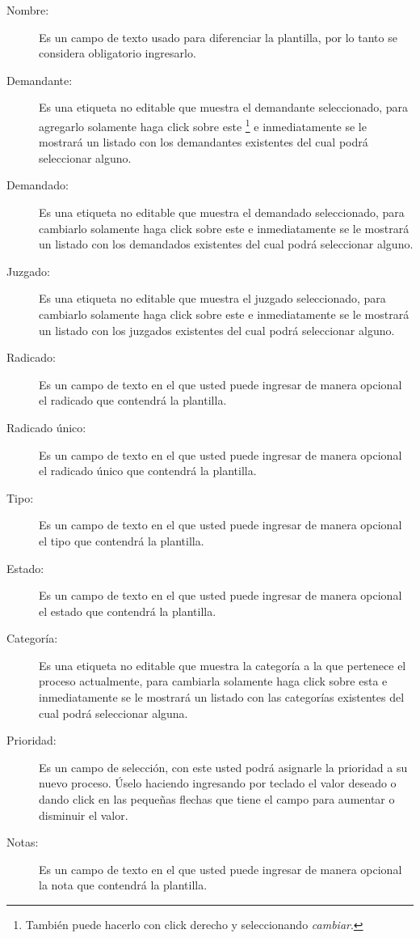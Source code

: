 \begin{description}
\item[Nombre:]Es un campo de texto usado para diferenciar la plantilla, por lo
tanto se considera obligatorio ingresarlo.
\item[Demandante:]Es una etiqueta no editable que muestra el demandante
seleccionado, para agregarlo solamente haga click sobre este
\footnote{Tambi\'en puede hacerlo con click derecho y seleccionando \emph{cambiar}.}
e inmediatamente se
le mostrar\'a un listado con los demandantes existentes del cual podr\'a
seleccionar alguno.
\item[Demandado:]Es una etiqueta no editable que muestra el demandado
seleccionado, para cambiarlo solamente haga click sobre este
\footnotemark[\value{footnote}]
e inmediatamente
se le mostrar\'a un listado con los demandados existentes del cual podr\'a
seleccionar alguno.
\item[Juzgado:]Es una etiqueta no editable que muestra el juzgado
seleccionado, para cambiarlo solamente haga click sobre este
\footnotemark[\value{footnote}]
e inmediatamente
se le mostrar\'a un listado con los juzgados existentes del cual podr\'a
seleccionar alguno.
\item[Radicado:]Es un campo de texto en el que usted puede ingresar de manera
opcional el radicado que contendr\'a la plantilla.
\item[Radicado \'unico:]Es un campo de texto en el que usted puede ingresar de
manera opcional el radicado \'unico que contendr\'a la plantilla.
\item[Tipo:]Es un campo de texto en el que usted puede ingresar de manera
opcional el tipo que contendr\'a la plantilla.
\item[Estado:]Es un campo de texto en el que usted puede ingresar de manera
opcional el estado que contendr\'a la plantilla.
\item[Categor\'ia:]Es una etiqueta no editable que muestra la categor\'ia
a la que pertenece el proceso actualmente, para cambiarla solamente haga click
sobre esta
\footnotemark[\value{footnote}]
e inmediatamente
se le mostrar\'a un listado con las categor\'ias existentes del cual podr\'a
seleccionar alguna.
\item[Prioridad:]Es un campo de selecci\'on, con este usted podr\'a asignarle
la prioridad a su nuevo proceso. \'Uselo haciendo ingresando por teclado el valor deseado o dando click en las peque\~nas flechas que tiene el campo para aumentar o disminuir el valor.
\item[Notas:]Es un campo de texto en el que usted puede ingresar de manera
opcional la nota que contendr\'a la plantilla.
\end{description}

